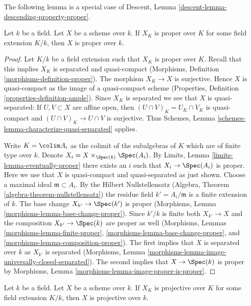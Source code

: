 \noindent
The following lemma is a special case of
Descent, Lemma \ref{descent-lemma-descending-property-proper}.

\begin{lemma}
\label{lemma-proper-after-field-extension}
Let $k$ be a field. Let $X$ be a scheme over $k$. If $X_K$ is proper
over $K$ for some field extension $K/k$, then $X$ is proper
over $k$.
\end{lemma}

\begin{proof}
Let $K/k$ be a field extension such that $X_K$ is proper over $K$.
Recall that this implies $X_K$ is separated and quasi-compact
(Morphisms, Definition \ref{morphisms-definition-proper}).
The morphism $X_K \to X$ is surjective. Hence $X$ is quasi-compact
as the image of a quasi-compact scheme (Properties, Definition
\ref{properties-definition-ample}). Since $X_K$ is separated
we see that $X$ is quasi-separated: If $U, V \subset X$ are
affine open, then $(U \cap V)_K = U_K \cap V_K$ is quasi-compact
and $(U \cap V)_K \to U \cap V$ is surjective. Thus
Schemes, Lemma \ref{schemes-lemma-characterize-quasi-separated} applies.

\medskip\noindent
Write $K = \colim A_i$ as the colimit of the subalgebras of $K$
which are of finite type over $k$. Denote
$X_i = X \times_{\Spec(k)} \Spec(A_i)$.
By Limits, Lemma \ref{limits-lemma-eventually-proper}
there exists an $i$ such that $X_i \to \Spec(A_i)$ is proper.
Here we use that $X$ is quasi-compact and quasi-separated as
just shown. Choose a maximal ideal $\mathfrak m \subset A_i$.
By the Hilbert Nullstellensatz
(Algebra, Theorem \ref{algebra-theorem-nullstellensatz})
the residue field $k' = A_i/\mathfrak m$ is a finite
extension of $k$.  The base change $X_{k'} \to \Spec(k')$
is proper (Morphisms, Lemma \ref{morphisms-lemma-base-change-proper}).
Since $k'/k$ is finite both $X_{k'} \to X$ and the composition
$X_{k'} \to \Spec(k)$
are proper as well (Morphisms, Lemmas \ref{morphisms-lemma-finite-proper},
\ref{morphisms-lemma-base-change-proper}, and
\ref{morphisms-lemma-composition-proper}).
The first implies that $X$ is separated over $k$ as $X_{k'}$
is separated
(Morphisms, Lemma \ref{morphisms-lemma-image-universally-closed-separated}).
The second implies that $X \to \Spec(k)$ is proper
by Morphisms, Lemma \ref{morphisms-lemma-image-proper-is-proper}.
\end{proof}

\begin{lemma}
\label{lemma-projective-after-field-extension}
Let $k$ be a field. Let $X$ be a scheme over $k$. If $X_K$ is projective
over $K$ for some field extension $K/k$, then $X$ is projective
over $k$.
\end{lemma}


